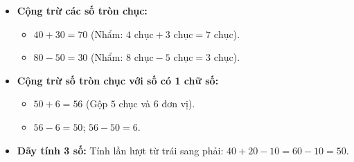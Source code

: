 \documentclass[11pt,a4paper]{article}
\begin{document}
\begin{minipage}[t]{0.49\textwidth}\vspace{0pt}
\begin{tcolorbox}[
  enhanced,
  colback=teal!4!white,
  colframe=teal!75!black,
  arc=2mm, boxrule=0.8pt,
  left=2mm, right=2mm, top=1.8mm, bottom=1.8mm,
  title={\footnotesize\bfseries\color{white}\faSliders\ 2. Kĩ năng tính nhẩm tròn chục}
]
{\footnotesize
\begin{itemize}\setlength{\itemsep}{1pt}\setlength{\leftskip}{-2.5mm}
  \item \textbf{Cộng trừ các số tròn chục:}
  \begin{itemize}\setlength{\itemsep}{0.5pt}\setlength{\leftskip}{-2.5mm}
    \item $40 + 30 = 70$ (Nhẩm: $4\text{ chục} + 3\text{ chục} = 7\text{ chục}$).
    \item $80 - 50 = 30$ (Nhẩm: $8\text{ chục} - 5\text{ chục} = 3\text{ chục}$).
  \end{itemize}
  \item \textbf{Cộng trừ số tròn chục với số có 1 chữ số:}
  \begin{itemize}\setlength{\itemsep}{0.5pt}\setlength{\leftskip}{-2.5mm}
    \item $50 + 6 = 56$ (Gộp $5$ chục và $6$ đơn vị).
    \item $56 - 6 = 50$; $56 - 50 = 6$.
  \end{itemize}
  \item \textbf{Dãy tính 3 số:} Tính lần lượt từ trái sang phải: $40 + 20 - 10 = 60 - 10 = 50$.
\end{itemize}
}
\end{tcolorbox}
\end{minipage}
\end{document}
